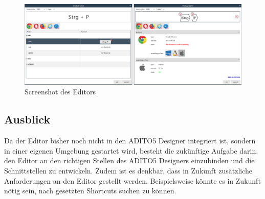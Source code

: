 \begin{figure}[H]
	\centering
	\includegraphics[width=1\linewidth]{../graphic/images/screenshots/Neuer-Editor}
	\caption{Screenshot des Editors}
	\label{fig:neuer-editor}
\end{figure}

\subsection{Ausblick}

Da der Editor bisher noch nicht in den ADITO5 Designer integriert ist, sondern in einer eigenen Umgebung gestartet wird, besteht die zukünftige Aufgabe darin, den Editor an den richtigen Stellen des ADITO5 Designers einzubinden und die Schnittstellen zu entwickeln. Zudem ist es denkbar, dass in Zukunft zusätzliche Anforderungen an den Editor gestellt werden. Beispielsweise könnte es in Zukunft nötig sein, nach gesetzten Shortcuts suchen zu können.
